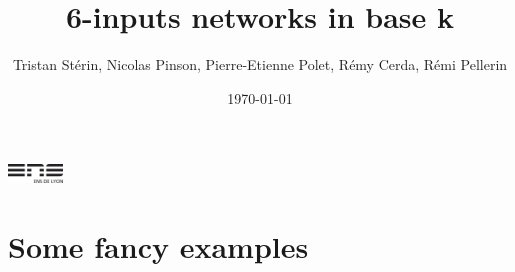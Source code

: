 \documentclass{beamer}
\begin{document}
\title{6-inputs networks in base k}
\author[T.Stérin,N.Pinson,P-E.Polet,R.Cerda,R.Pellerin]{Tristan Stérin, Nicolas Pinson, Pierre-Etienne Polet, Rémy Cerda, Rémi Pellerin}
\date{\today} 


\begin{frame}
	\titlepage
	\begin{center}
	\includegraphics[height=0.5cm]{logoens.pdf}
	\end{center}
\end{frame}


\section{Some fancy examples}

\end{document}
